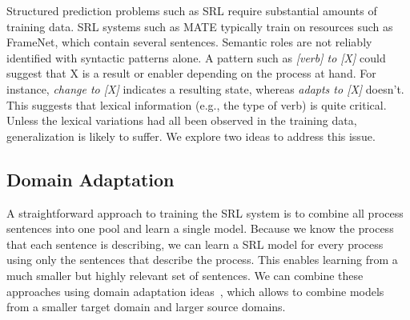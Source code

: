 Structured prediction problems such as SRL require substantial amounts of training data. 
SRL systems such as MATE typically train on resources such as FrameNet, which contain several  sentences. 
Semantic roles are not reliably identified with syntactic patterns alone. 
A pattern such as {\em [verb] to [X]} could suggest that X is a result or enabler depending on the process at hand. 
For instance, {\em change to [X]} indicates a resulting state, whereas {\em adapts to [X]} doesn't. 
This suggests that lexical information (e.g., the type of verb) is quite critical. 
Unless the lexical variations had all been observed in the training data, generalization is likely to suffer. 
We explore two ideas to address this issue.

\subsection{Domain Adaptation}

A straightforward approach to training the SRL system is to combine all process sentences into one pool and learn a single model. 
Because we know the process that each sentence is describing, we can learn a SRL model for every process using only the sentences that describe the process. 
This enables learning from a much smaller but highly relevant set of sentences. 
We can combine these approaches using domain adaptation ideas~\cite{}, which allows to combine models from a smaller target domain and larger source domains. 





